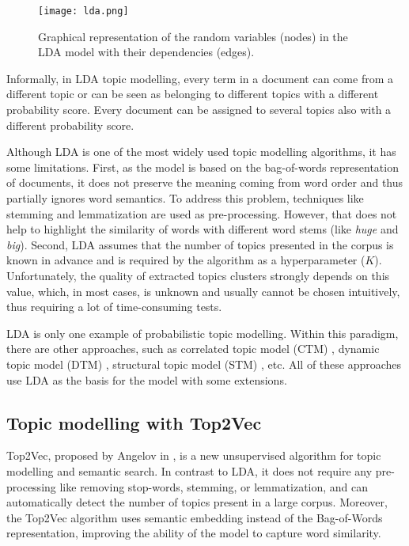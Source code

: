 \documentclass[fontsize=12pt,a4paper,twoside,openany]{scrbook}
\begin{document}
\begin{figure}[h]
\centering
\texttt{[image: lda.png]}
\caption{Graphical representation of the random variables (nodes) in the LDA model with their dependencies (edges).}
\label{fig:lda}
\end{figure}

Informally, in LDA topic modelling, every term in a document can come from a different topic or can be seen as belonging to different topics with a different probability score. Every document can be assigned to several topics also with a different probability score.

Although LDA is one of the most widely used topic modelling algorithms, it has some limitations. First, as the model is based on the bag-of-words representation of documents, it does not preserve the meaning coming from word order and thus partially ignores word semantics. To address this problem, techniques like stemming and lemmatization are used as pre-processing. However, that does not help to highlight the similarity of words with different word stems (like \emph{huge} and \emph{big}). Second, LDA assumes that the number of topics presented in the corpus is known in advance and is required by the algorithm as a hyperparameter (\(K\)). Unfortunately, the quality of extracted topics clusters strongly depends on this value, which, in most cases, is unknown and usually cannot be chosen intuitively, thus requiring a lot of time-consuming tests. 

LDA is only one example of probabilistic topic modelling. Within this paradigm, there are other approaches, such as correlated topic model (CTM) \parencite{Blei05}, dynamic topic model (DTM) \parencite{Blei06}, structural topic model (STM) \parencite{Roberts13}, etc. All of these approaches use LDA as the basis for the model with some extensions.

\subsection{Topic modelling with Top2Vec}
\label{sec:Top2Vec}

Top2Vec, proposed by Angelov in \cite*{Angelov20}, is a new unsupervised algorithm for topic modelling and semantic search. In contrast to LDA, it does not require any pre-processing like removing stop-words, stemming, or lemmatization, and can automatically detect the number of topics present in a large corpus. Moreover, the Top2Vec algorithm uses semantic embedding instead of the Bag-of-Words representation, improving the ability of the model to capture word similarity.
\end{document}
